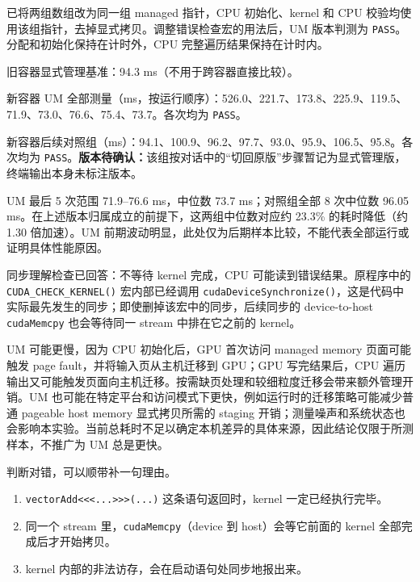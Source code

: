 \documentclass[11pt,a4paper,fontset=none]{ctexart}
\begin{document}
\begin{tcolorbox}[title={2.3 实验记录},breakable]
已将两组数组改为同一组 managed 指针，CPU 初始化、kernel 和 CPU 校验均使用该组指针，去掉显式拷贝。调整错误检查宏的用法后，UM 版本判测为 \texttt{PASS}。分配和初始化保持在计时外，CPU 完整遍历结果保持在计时内。

旧容器显式管理基准：94.3 ms（不用于跨容器直接比较）。

新容器 UM 全部测量（ms，按运行顺序）：526.0、221.7、173.8、225.9、119.5、71.9、73.0、76.6、75.4、73.7。各次均为 \texttt{PASS}。

新容器后续对照组（ms）：94.1、100.9、96.2、97.7、93.0、95.9、106.5、95.8。各次均为 \texttt{PASS}。\textbf{版本待确认：}该组按对话中的“切回原版”步骤暂记为显式管理版，终端输出本身未标注版本。

UM 最后 5 次范围 71.9--76.6 ms，中位数 73.7 ms；对照组全部 8 次中位数 96.05 ms。在上述版本归属成立的前提下，这两组中位数对应约 23.3\% 的耗时降低（约 1.30 倍加速）。UM 前期波动明显，此处仅为后期样本比较，不能代表全部运行或证明具体性能原因。

同步理解检查已回答：不等待 kernel 完成，CPU 可能读到错误结果。原程序中的 \texttt{CUDA\_CHECK\_KERNEL()} 宏内部已经调用 \texttt{cudaDeviceSynchronize()}，这是代码中实际最先发生的同步；即使删掉该宏中的同步，后续同步的 device-to-host \texttt{cudaMemcpy} 也会等待同一 stream 中排在它之前的 kernel。

UM 可能更慢，因为 CPU 初始化后，GPU 首次访问 managed memory 页面可能触发 page fault，并将输入页从主机迁移到 GPU；GPU 写完结果后，CPU 遍历输出又可能触发页面向主机迁移。按需缺页处理和较细粒度迁移会带来额外管理开销。UM 也可能在特定平台和访问模式下更快，例如运行时的迁移策略可能减少普通 pageable host memory 显式拷贝所需的 staging 开销；测量噪声和系统状态也会影响本实验。当前总耗时不足以确定本机差异的具体来源，因此结论仅限于所测样本，不推广为 UM 总是更快。
\end{tcolorbox}

判断对错，可以顺带补一句理由。
\begin{enumerate}[label=(\alph*)]
  \item \texttt{vectorAdd<<<...>>>(...)} 这条语句返回时，kernel 一定已经执行完毕。
  \item 同一个 stream 里，\texttt{cudaMemcpy}（device 到 host）会等它前面的 kernel 全部完成后才开始拷贝。
  \item kernel 内部的非法访存，会在启动语句处同步地报出来。
\end{enumerate}
\end{document}
